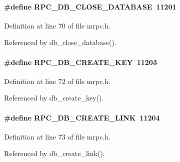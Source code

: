 \paragraph[{RPC\_\-DB\_\-CLOSE\_\-DATABASE}]{\setlength{\rightskip}{0pt plus 5cm}\#define RPC\_\-DB\_\-CLOSE\_\-DATABASE~11201}\hfill\label{group__mrpcdefineh_ga085261b8782a013825aeadb0838a5bfb}

\begin{DoxyItemize}
\item 
\end{DoxyItemize}

Definition at line 70 of file mrpc.h.

Referenced by db\_\-close\_\-database().
\paragraph[{RPC\_\-DB\_\-CREATE\_\-KEY}]{\setlength{\rightskip}{0pt plus 5cm}\#define RPC\_\-DB\_\-CREATE\_\-KEY~11203}\hfill\label{group__mrpcdefineh_gafcf9aa4b3da3f9be05de7fb40ab36cd2}

\begin{DoxyItemize}
\item 
\end{DoxyItemize}

Definition at line 72 of file mrpc.h.

Referenced by db\_\-create\_\-key().
\paragraph[{RPC\_\-DB\_\-CREATE\_\-LINK}]{\setlength{\rightskip}{0pt plus 5cm}\#define RPC\_\-DB\_\-CREATE\_\-LINK~11204}\hfill\label{group__mrpcdefineh_ga1685e0fb21760febac20d116b93708dd}

\begin{DoxyItemize}
\item 
\end{DoxyItemize}

Definition at line 73 of file mrpc.h.

Referenced by db\_\-create\_\-link().

